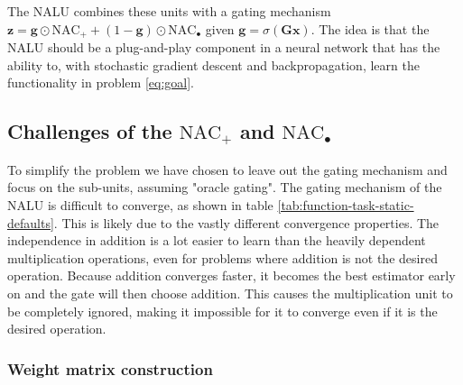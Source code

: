 The NALU combines these units with a gating mechanism $\mathbf{z} = \mathbf{g} \odot \text{NAC}_{+} + (1 - \mathbf{g}) \odot \text{NAC}_{\bullet}$ given $\mathbf{g} = \sigma(\mathbf{G} \mathbf{x})$. The idea is that the NALU should be a plug-and-play component in a neural network that has the ability to, with stochastic gradient descent and backpropagation, learn the functionality in problem \ref{eq:goal}.

\subsection{Challenges of the $\text{NAC}_{+}$ and $\text{NAC}_{\bullet}$}
To simplify the problem we have chosen to leave out the gating mechanism and focus on the sub-units, assuming "oracle gating". The gating mechanism of the NALU is difficult to converge, as shown in table \ref{tab:function-task-static-defaults}. This is likely due to the vastly different convergence properties. The independence in addition is a lot easier to learn than the heavily dependent multiplication operations, even for problems where addition is not the desired operation. Because addition converges faster, it becomes the best estimator early on and the gate will then choose addition. This causes the multiplication unit to be completely ignored, making it impossible for it to converge even if it is the desired operation.





\subsubsection{Weight matrix construction}\label{sssec:weight}

